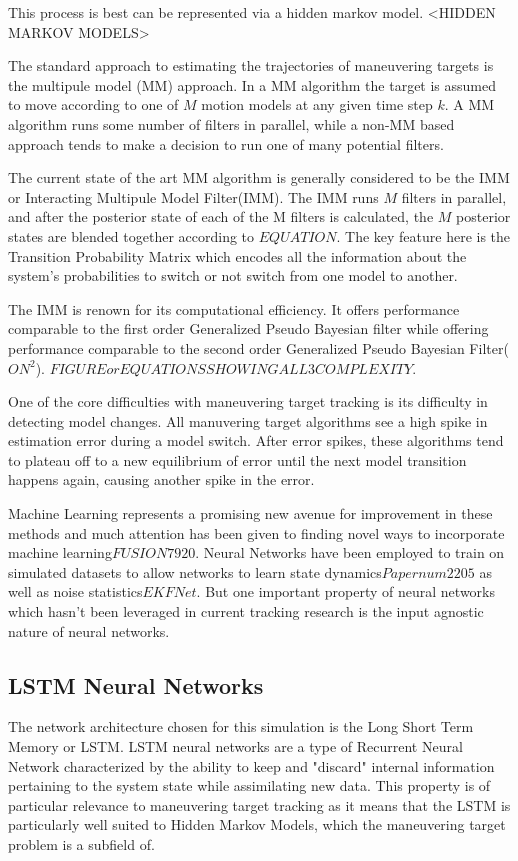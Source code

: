 \documentclass[conference]{IEEEtran}
\begin{document}
This process is best can be represented via a hidden markov model. <HIDDEN MARKOV MODELS>

The standard approach to estimating the trajectories of maneuvering targets is the multipule model (MM) approach. In a MM algorithm the target is assumed to move according to one of $M$ motion models at any given time step $k$. A MM algorithm runs some number of filters in parallel, while a non-MM based approach tends to make a decision to run one of many potential filters. 

The current state of the art MM algorithm is generally considered to be the IMM or Interacting Multipule Model Filter(IMM). The IMM runs $M$ filters in parallel, and after the posterior state of each of the M filters is calculated, the $M$ posterior states are blended together according to $EQUATION$. The key feature here is the Transition Probability Matrix which encodes all the information about the system's probabilities to switch or not switch from one model to another.

The IMM is renown for its computational efficiency. It offers performance comparable to the first order Generalized Pseudo Bayesian filter while offering performance comparable to the second order Generalized Pseudo Bayesian Filter($ON^2$). $FIGURE or EQUATIONS SHOWING ALL 3 COMPLEXITY$.

One of the core difficulties with maneuvering target tracking is its difficulty in detecting model changes. All manuvering target algorithms see a high spike in estimation error during a model switch. After error spikes, these algorithms tend to plateau off to a new equilibrium of error until the next model transition happens again, causing another spike in the error.

Machine Learning represents a promising new avenue for improvement in these methods and much attention has been given to finding novel ways to incorporate machine learning$FUSION 7920$. Neural Networks have been employed to train on simulated datasets to allow networks to learn state dynamics$Paper num 2205$ as well as noise statistics$EKF Net$. But one important property of neural networks which hasn't been leveraged in current tracking research is the input agnostic nature of neural networks.

\subsection{LSTM Neural Networks}

The network architecture chosen for this simulation is the Long Short Term Memory or LSTM. LSTM neural networks are a type of Recurrent Neural Network characterized by the ability to keep and "discard" internal information pertaining to the system state while assimilating new data. This property is of particular relevance to maneuvering target tracking as it means that the LSTM is particularly well suited to Hidden Markov Models, which the maneuvering target problem is a subfield of.
\end{document}
